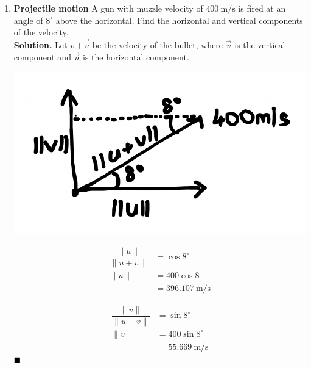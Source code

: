 \documentclass{report}
\begin{document}
\begin{enumerate}
    \item \textbf{Projectile motion} A gun with muzzle velocity of $400 \mathrm{~m} / \mathrm{s}$ is fired at an angle of $8^{\circ}$ above the horizontal. Find the horizontal and vertical components of the velocity.
          \\\textbf{Solution. }Let $\vec{v + u}$ be the velocity of the bullet, where $\vec{v}$ is the vertical component and $\vec{u}$ is the horizontal component.
          \begin{multicols}{2}
              \begin{center}
                  \includegraphics[scale=0.5]{assets/thomas12.3q25.png}
              \end{center}
              \columnbreak
              \begin{align*}
                  \dfrac{\lVert u \lVert}{\lVert u + v \rVert} & = \cos 8^{\circ}                   \\
                  \lVert u \rVert                              & = 400 \cos 8^{\circ}               \\
                                                               & = 396.107 \mathrm{~m} / \mathrm{s}
              \end{align*}

              \begin{align*}
                  \dfrac{\lVert v \lVert}{\lVert u + v \rVert} & = \sin 8^{\circ}                  \\
                  \lVert v \rVert                              & = 400 \sin 8^{\circ}              \\
                                                               & = 55.669 \mathrm{~m} / \mathrm{s}
              \end{align*}
              $\hfill\blacksquare$
          \end{multicols}


\end{enumerate}
\end{document}
